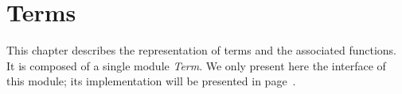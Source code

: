 
\newpage
\section*{Terms}

\ocwsection\label{terms}
This chapter describes the representation of terms and the associated
functions. It is composed of a single module \textit{Term}. 
We only present here the interface of this module; its implementation
will be presented in page~\pageref{implterms}.